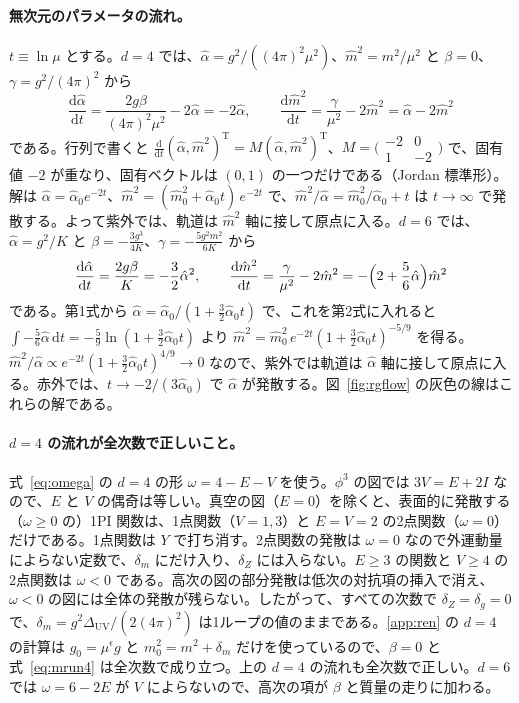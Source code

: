 \documentclass[a4paper,10pt]{ltjsarticle}
\newcommand{\dd}{\mathrm{d}}
\begin{document}
\paragraph{無次元のパラメータの流れ。}$t\equiv\ln\mu$ とする。$d=4$ では、$\hat\alpha=g^2/((4\pi)^2\mu^2)$、$\hat m^2=m^2/\mu^2$ と $\beta=0$、$\gamma=g^2/(4\pi)^2$ から
\begin{equation*}
\frac{\dd\hat\alpha}{\dd t}=\frac{2g\beta}{(4\pi)^2\mu^2}-2\hat\alpha=-2\hat\alpha,\qquad
\frac{\dd\hat m^2}{\dd t}=\frac{\gamma}{\mu^2}-2\hat m^2=\hat\alpha-2\hat m^2
\end{equation*}
である。行列で書くと $\frac{\dd}{\dd t}(\hat\alpha,\hat m^2)^{\mathrm T}=M(\hat\alpha,\hat m^2)^{\mathrm T}$、$M=\bigl(\begin{smallmatrix}-2&0\\1&-2\end{smallmatrix}\bigr)$ で、固有値 $-2$ が重なり、固有ベクトルは $(0,1)$ の一つだけである（Jordan 標準形）。解は $\hat\alpha=\hat\alpha_0e^{-2t}$、$\hat m^2=(\hat m_0^2+\hat\alpha_0t)\,e^{-2t}$ で、$\hat m^2/\hat\alpha=\hat m_0^2/\hat\alpha_0+t$ は $t\to\infty$ で発散する。よって紫外では、軌道は $\hat m^2$ 軸に接して原点に入る。$d=6$ では、$\hat\alpha=g^2/K$ と $\beta=-\frac{3g^3}{4K}$、$\gamma=-\frac{5g^2m^2}{6K}$ から
\begin{equation*}
\frac{\dd\hat\alpha}{\dd t}=\frac{2g\beta}{K}=-\frac32\hat\alpha^2,\qquad
\frac{\dd\hat m^2}{\dd t}=\frac{\gamma}{\mu^2}-2\hat m^2=-\Bigl(2+\frac56\hat\alpha\Bigr)\hat m^2
\end{equation*}
である。第1式から $\hat\alpha=\hat\alpha_0/(1+\frac32\hat\alpha_0t)$ で、これを第2式に入れると $\int-\frac56\hat\alpha\,\dd t=-\frac59\ln(1+\frac32\hat\alpha_0t)$ より $\hat m^2=\hat m_0^2\,e^{-2t}(1+\frac32\hat\alpha_0t)^{-5/9}$ を得る。$\hat m^2/\hat\alpha\propto e^{-2t}(1+\frac32\hat\alpha_0t)^{4/9}\to0$ なので、紫外では軌道は $\hat\alpha$ 軸に接して原点に入る。赤外では、$t\to-2/(3\hat\alpha_0)$ で $\hat\alpha$ が発散する。図~\ref{fig:rgflow} の灰色の線はこれらの解である。

\paragraph{$d=4$ の流れが全次数で正しいこと。}式~\eqref{eq:omega} の $d=4$ の形 $\omega=4-E-V$ を使う。$\phi^3$ の図では $3V=E+2I$ なので、$E$ と $V$ の偶奇は等しい。真空の図（$E=0$）を除くと、表面的に発散する（$\omega\ge0$ の）1PI 関数は、1点関数（$V=1,3$）と $E=V=2$ の2点関数（$\omega=0$）だけである。1点関数は $Y$ で打ち消す。2点関数の発散は $\omega=0$ なので外運動量によらない定数で、$\delta_m$ にだけ入り、$\delta_Z$ には入らない。$E\ge3$ の関数と $V\ge4$ の2点関数は $\omega<0$ である。高次の図の部分発散は低次の対抗項の挿入で消え、$\omega<0$ の図には全体の発散が残らない。したがって、すべての次数で $\delta_Z=\delta_g=0$ で、$\delta_m=g^2\Delta_{\mathrm{UV}}/(2(4\pi)^2)$ は1ループの値のままである。\ref{app:ren} の $d=4$ の計算は $g_0=\mu^\epsilon g$ と $m_0^2=m^2+\delta_m$ だけを使っているので、$\beta=0$ と式~\eqref{eq:mrun4} は全次数で成り立つ。上の $d=4$ の流れも全次数で正しい。$d=6$ では $\omega=6-2E$ が $V$ によらないので、高次の項が $\beta$ と質量の走りに加わる。
\end{document}
